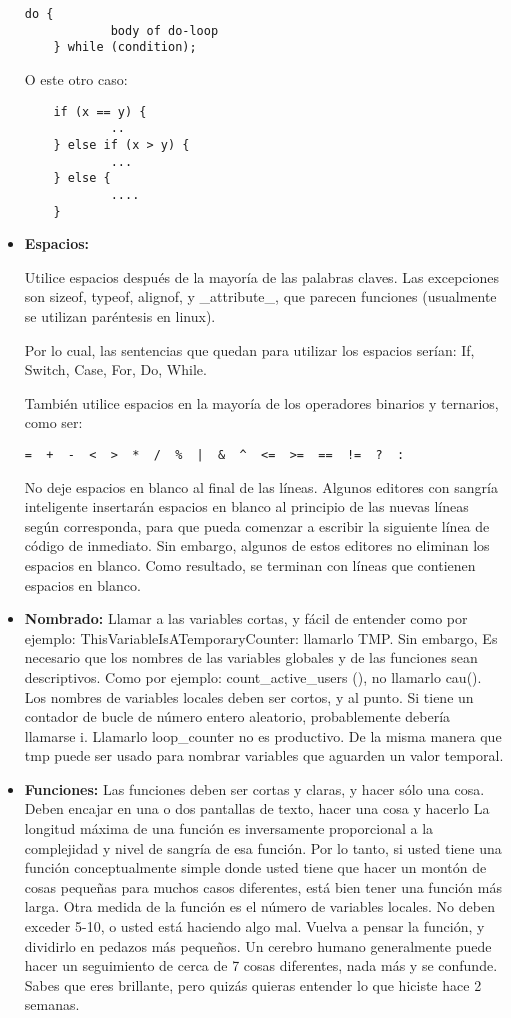 \begin{itemize}
\begin{verbatim}
do {
	        body of do-loop
	} while (condition);
\end{verbatim}
O este otro caso:
\begin{verbatim}
	if (x == y) {
	        ..
	} else if (x > y) {
	        ...
	} else {
	        ....
	}
\end{verbatim}


\item\textbf{Espacios:}
{Utilice espacios después de la mayoría de las palabras claves. Las excepciones son sizeof, typeof, alignof, y \_attribute\_, que parecen funciones (usualmente se utilizan paréntesis en linux).

Por lo cual, las sentencias que quedan para utilizar los espacios serían: If, Switch, Case, For, Do, While.

También utilice espacios en la mayoría de los operadores binarios y ternarios, como ser: 
\begin{verbatim}
=  +  -  <  >  *  /  %  |  &  ^  <=  >=  ==  !=  ?  :    
\end{verbatim}

No deje espacios en blanco al final de las líneas. Algunos editores con sangría inteligente insertarán espacios en blanco al principio de las nuevas líneas según corresponda, para que pueda comenzar a escribir la siguiente línea de código de inmediato. Sin embargo, algunos de estos editores no eliminan los espacios en blanco. Como resultado, se terminan con líneas que contienen espacios en blanco.}


\item\textbf{Nombrado:}
{Llamar a las variables cortas, y fácil de entender como por ejemplo:
ThisVariableIsATemporaryCounter: llamarlo TMP.
Sin embargo, Es necesario que los nombres de las variables globales y de las funciones sean descriptivos. Como por ejemplo: count\_active\_users (), no llamarlo cau().
Los nombres de variables locales deben ser cortos, y al punto. Si tiene un contador de bucle de número entero aleatorio, probablemente debería llamarse i. Llamarlo loop\_counter no es productivo. De la misma manera que tmp puede ser usado para nombrar variables que aguarden un valor temporal.}

\item\textbf{Funciones:}
{Las funciones deben ser cortas y claras, y hacer sólo una cosa. Deben encajar en una o dos pantallas de texto, hacer una cosa y hacerlo
La longitud máxima de una función es inversamente proporcional a la complejidad y nivel de sangría de esa función. Por lo tanto, si usted tiene una función conceptualmente simple donde usted tiene que hacer un montón de cosas pequeñas para muchos casos diferentes, está bien tener una función más larga.
Otra medida de la función es el número de variables locales. No deben exceder 5-10, o usted está haciendo algo mal. Vuelva a pensar la función, y dividirlo en pedazos más pequeños. Un cerebro humano generalmente puede hacer un seguimiento de cerca de 7 cosas diferentes, nada más y se confunde. Sabes que eres brillante, pero quizás quieras entender lo que hiciste hace 2 semanas.}


\end{itemize}
